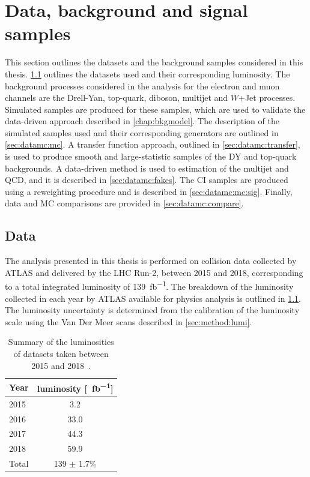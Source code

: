 \chapter{Data, background and signal samples}\label{chap:datamc}

This section outlines the datasets and the background samples considered in this thesis. \cref{sec:datamc:data} outlines the datasets used and their corresponding luminosity. The background processes considered in the analysis for the electron and muon channels are the Drell-Yan, top-quark, diboson, multijet and $W$+Jet processes. Simulated samples are produced for these samples, which are used to validate the data-driven approach described in \cref{chap:bkgmodel}. The description of the simulated samples used and their corresponding generators are outlined in \cref{sec:datamc:mc}. A transfer function approach, outlined in \cref{sec:datamc:transfer}, is used to produce smooth and large-statistic samples of the DY and top-quark backgrounds. A data-driven method is used to estimation of the multijet and QCD, and it is described in \cref{sec:datamc:fakes}. The CI samples are produced using a reweighting procedure and is described in \cref{sec:datamc:mc:sig}. Finally, data and MC comparisons are provided in \cref{sec:datamc:compare}.


\section{Data}\label{sec:datamc:data}
The analysis presented in this thesis is performed on \emph{\protonproton} collision data collected by ATLAS and delivered by the LHC Run-2, between 2015 and 2018, corresponding to a total integrated luminosity of \SI{139}{\femto\barn^{-1}}. The breakdown of the luminosity collected in each year by ATLAS available for physics analysis is outlined in \cref{tab:data:lumi}. The luminosity uncertainty is determined from the calibration of the luminosity scale using the Van Der Meer scans described in \cref{sec:method:lumi}. 
\begin{table}[h]
    \centering
    \begin{tabular}{l|c}
        Year & luminosity [\SI{}{\femto\barn^{-1}}] \\
        \hline
        2015 & 3.2 \\
        2016 & 33.0 \\
        2017 & 44.3 \\
        2018 & 59.9 \\
        \hline 
        \hline
        Total & 139 $\pm$ 1.7\% \\
	\end{tabular}
    \caption[Summary of the luminosities of datasets taken between 2015 and 2018]{Summary of the luminosities of datasets taken between 2015 and 2018~\cite{ATLAS:lumiPlots}.}
    \label{tab:data:lumi}
  \end{table}


